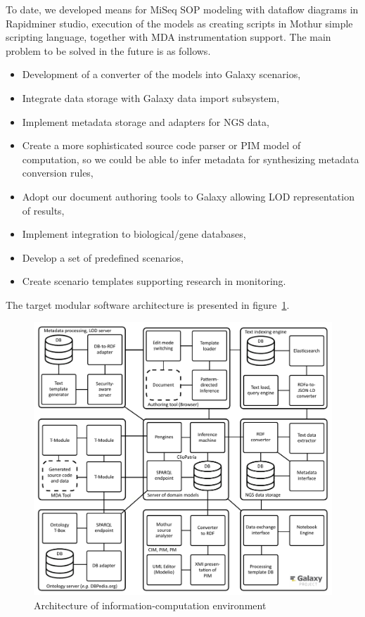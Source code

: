 \documentclass[a4paper]{jpconf}
\begin{document}
To date, we developed means for MiSeq SOP modeling with dataflow diagrams in Rapidminer studio, execution of the models as creating scripts in Mothur simple scripting language, together with MDA instrumentation support. The main problem to be solved in the future is as follows.
\begin{itemize}
\item Development of a converter of the models into Galaxy scenarios,
\item Integrate data storage with Galaxy data import subsystem,
\item Implement metadata storage and adapters for NGS data,
\item Create a more sophisticated source code parser or PIM model of computation, so we could be able to infer metadata for synthesizing metadata conversion rules,
\item Adopt our document authoring tools to Galaxy allowing LOD representation of results,
\item Implement integration to biological/gene databases,
\item Develop a set of predefined scenarios,
\item Create scenario templates supporting research in monitoring.
\end{itemize}
The target modular software architecture is presented in figure~\ref{fig:metadata}.
\begin{figure}[bt]
  \centering
   \includegraphics[width=0.8\linewidth]{architecture-mda-lod-ext-galaxy.pdf}
  \caption{Architecture of information-computation environment}
  \label{fig:metadata}
\end{figure}
\end{document}
